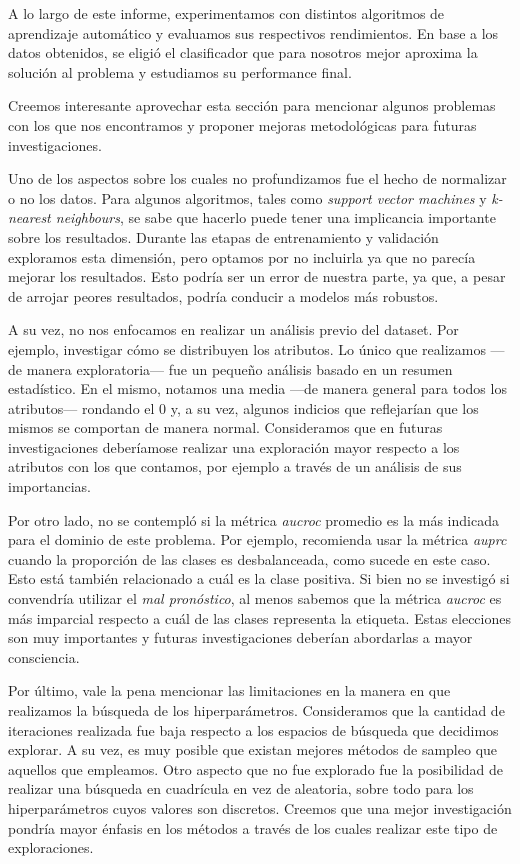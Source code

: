 A lo largo de este informe, experimentamos con distintos algoritmos de aprendizaje automático y evaluamos sus respectivos rendimientos. En base a los datos obtenidos, se eligió el clasificador que para nosotros mejor aproxima la solución al problema y estudiamos su performance final. 

Creemos interesante aprovechar esta sección para mencionar algunos problemas con los que nos encontramos y proponer mejoras metodológicas para futuras investigaciones.

Uno de los aspectos sobre los cuales no profundizamos fue el hecho de normalizar o no los datos. Para algunos algoritmos, tales como \textit{support vector machines} y \textit{k-nearest neighbours}, se sabe que hacerlo puede tener una implicancia importante sobre los resultados. Durante las etapas de entrenamiento y validación exploramos esta dimensión, pero optamos por no incluirla ya que no parecía mejorar los resultados. Esto podría ser un error de nuestra parte, ya que, a pesar de arrojar peores resultados, podría conducir a modelos más robustos.

A su vez, no nos enfocamos en realizar un análisis previo del dataset. Por ejemplo, investigar cómo se distribuyen los atributos. Lo único que realizamos ---de manera exploratoria--- fue un pequeño análisis basado en un resumen estadístico. En el mismo, notamos una media ---de manera general para todos los atributos--- rondando el $0$ y, a su vez, algunos indicios que reflejarían que los mismos se comportan de manera normal. Consideramos que en futuras investigaciones deberíamose realizar una exploración mayor respecto a los atributos con los que contamos, por ejemplo a través de un análisis de sus importancias.

Por otro lado, no se contempló si la métrica \textit{aucroc} promedio es la más indicada para el dominio de este problema. Por ejemplo, \cite{Saito} recomienda usar la métrica \textit{auprc} cuando la proporción de las clases es desbalanceada, como sucede en este caso. Esto está también relacionado a cuál es la clase positiva. Si bien no se investigó si convendría utilizar el \textit{mal pronóstico}, al menos sabemos que la métrica \textit{aucroc} es más imparcial respecto a cuál de las clases representa la etiqueta. Estas elecciones son muy importantes y futuras investigaciones deberían abordarlas a mayor consciencia.

Por último, vale la pena mencionar las limitaciones en la manera en que realizamos la búsqueda de los hiperparámetros. Consideramos que la cantidad de iteraciones realizada fue baja respecto a los espacios de búsqueda que decidimos explorar. A su vez, es muy posible que existan mejores métodos de sampleo que aquellos que empleamos. Otro aspecto que no fue explorado fue la posibilidad de realizar una búsqueda en cuadrícula en vez de aleatoria, sobre todo para los hiperparámetros cuyos valores son discretos. Creemos que una mejor investigación pondría mayor énfasis en los métodos a través de los cuales realizar este tipo de exploraciones.